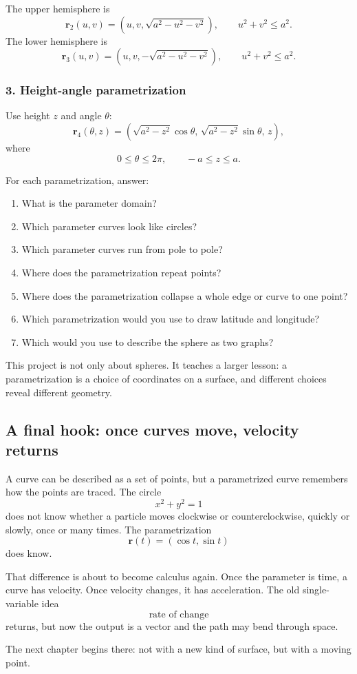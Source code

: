 The upper hemisphere is
\[
    \mathbf r_2(u,v)
    =
    \left(u,v,\sqrt{a^2-u^2-v^2}\right),
    \qquad
    u^2+v^2\le a^2.
\]
The lower hemisphere is
\[
    \mathbf r_3(u,v)
    =
    \left(u,v,-\sqrt{a^2-u^2-v^2}\right),
    \qquad
    u^2+v^2\le a^2.
\]

\subsubsection*{3. Height-angle parametrization}

Use height \(z\) and angle \(\theta\):
\[
    \mathbf r_4(\theta,z)
    =
    \left(
        \sqrt{a^2-z^2}\cos\theta,\,
        \sqrt{a^2-z^2}\sin\theta,\,
        z
    \right),
\]
where
\[
    0\le\theta\le2\pi,\qquad -a\le z\le a.
\]

For each parametrization, answer:

\begin{enumerate}
\item What is the parameter domain?
\item Which parameter curves look like circles?
\item Which parameter curves run from pole to pole?
\item Where does the parametrization repeat points?
\item Where does the parametrization collapse a whole edge or curve to one point?
\item Which parametrization would you use to draw latitude and longitude?
\item Which would you use to describe the sphere as two graphs?
\end{enumerate}

This project is not only about spheres.  It teaches a larger lesson: a parametrization is
a choice of coordinates on a surface, and different choices reveal different geometry.

\subsection{A final hook: once curves move, velocity returns}

A curve can be described as a set of points, but a parametrized curve remembers how the
points are traced.  The circle
\[
    x^2+y^2=1
\]
does not know whether a particle moves clockwise or counterclockwise, quickly or
slowly, once or many times.  The parametrization
\[
    \mathbf r(t)=(\cos t,\sin t)
\]
does know.

That difference is about to become calculus again.  Once the parameter is time, a curve
has velocity.  Once velocity changes, it has acceleration.  The old single-variable idea
\[
    \text{rate of change}
\]
returns, but now the output is a vector and the path may bend through space.

The next chapter begins there: not with a new kind of surface, but with a moving point.